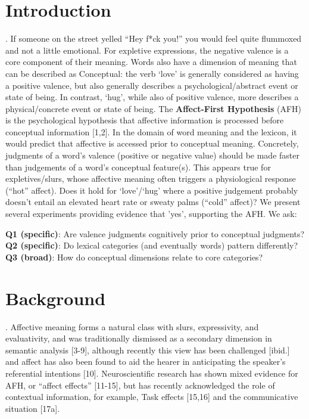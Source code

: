 \section{Introduction}. 
If someone on the street yelled ``Hey f*ck you!'' you would feel quite flummoxed and not a little emotional. For expletive expressions, the negative valence is a core component of their meaning. Words also have a dimension of meaning that can be described as Conceptual: the verb `love' is generally considered as having a positive valence, but also generally describes a psychological/abstract event or state of being. In contrast, `hug', while also of positive valence, more describes a physical/concrete event or state of being. The \textbf{ Affect-First Hypothesis} (AFH) is the psychological hypothesis that affective information is processed before conceptual information [1,2]. In the domain of word meaning and the lexicon, it would predict that affective is accessed prior to conceptual meaning. Concretely, judgments of a word's valence (positive or negative value) should be made faster than judgements of a word's conceptual feature(s). This appears true for expletives/slurs, whose affective meaning often triggers a physiological response (``hot'' affect). Does it hold for `love'/`hug' where a positive judgement probably doesn't entail an elevated heart rate or sweaty palms (``cold'' affect)? We present several experiments providing evidence that 'yes', supporting the AFH. We ask:

\begin{tcolorbox}[colback=white]
\centering
\textbf{Q1 (specific)}: Are valence judgments cognitively prior to conceptual judgments? \\ 
\textbf{Q2 (specific)}: Do lexical categories (and eventually words) pattern differently?\\
\textbf{Q3 (broad)}: How do conceptual dimensions relate to core categories?
\end{tcolorbox}

\section{Background}.
Affective meaning forms a natural class with slurs, expressivity, and evaluativity, and was traditionally dismissed as a secondary dimension in semantic analysis [3-9], although recently this view has been challenged [ibid.] and affect has also been found to aid the hearer in anticipating the speaker's referential intentions [10]. Neuroscientific research has shown mixed evidence for AFH, or ``affect effects'' [11-15], but has recently acknowledged the role of contextual information, %
for example, Task effects [15,16] and the communicative situation [17a]. 


